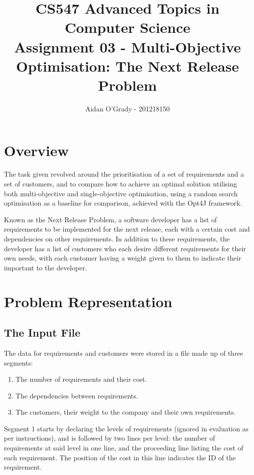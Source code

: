\documentclass[10pt, a4paper]{article}
\begin{document}
\title{CS547 Advanced Topics in Computer Science\\
\large{Assignment 03 - Multi-Objective Optimisation: The Next Release Problem}}
\author{Aidan O'Grady - 201218150}
\date{}
\maketitle

\section{Overview}
\label{sec:overview}
The task given revolved around the prioritisation of a set of requirements and
a set of customers, and to compare how to achieve an optimal solution utilising
both multi-objective and single-objective optimisation, using a random search
optimisation as a baseline for comparison, achieved with the Opt4J framework.

Known as the Next Release Problem, a software developer has a list of
requirements to be implemented for the next release, each with a certain cost
and dependencies on other requirements. In addition to these requirements, the
developer has a list of customers who each desire different requirements for
their own needs, with each customer having a weight given to them to indicate
their important to the developer.

\section{Problem Representation}
\label{sec:problem_representation}
\subsection{The Input File} %
\label{sub:the_input_file}
The data for requirements and customers were stored in a file made up of three
segments:

\begin{enumerate}
    \item The number of requirements and their cost.
    \item The dependencies between requirements.
    \item The customers, their weight to the company and their own requirements.
\end{enumerate}

Segment 1 starts by declaring the levels of requirements (ignored in evaluation
as per instructions), and is followed by two lines per level: the number of
requirements at said level in one line, and the proceeding line listing the cost
of each requirement. The position of the cost in this line indicates the ID of
the requirement.
\end{document}

